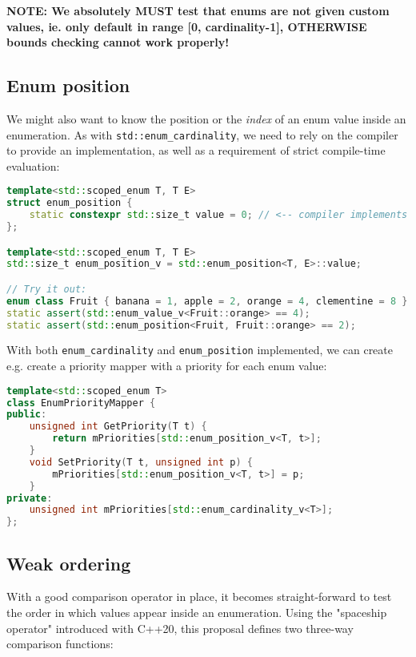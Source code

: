 \documentclass[
  format=manuscript,
  screen=true,
  review=false,
  nonacm=true,
  timestamp=true,
  balance=false]{acmart}
\begin{document}
\noindent
\textbf{NOTE: We absolutely MUST test that enums are not given custom values, ie.
only default in range [0, cardinality-1], OTHERWISE bounds checking cannot work properly!}



\subsection{Enum position}

We might also want to know the position or the \textit{index} of an enum value
inside an enumeration. As with \texttt{std::enum\_cardinality}, we need to rely
on the compiler to provide an implementation, as well as a requirement of strict
compile-time evaluation:\vspace{2mm}

\begin{lstlisting}[language=Cpp]
template<std::scoped_enum T, T E>
struct enum_position {
    static constexpr std::size_t value = 0; // <-- compiler implements this
};

template<std::scoped_enum T, T E>
std::size_t enum_position_v = std::enum_position<T, E>::value;

// Try it out:
enum class Fruit { banana = 1, apple = 2, orange = 4, clementine = 8 };
static assert(std::enum_value_v<Fruit::orange> == 4);
static assert(std::enum_position<Fruit, Fruit::orange> == 2);
\end{lstlisting}

\noindent
With both \texttt{enum\_cardinality} and \texttt{enum\_position} implemented, we
can create e.g. create a priority mapper with a priority for each enum value:\vspace{2mm}

\begin{lstlisting}[language=Cpp]
template<std::scoped_enum T>
class EnumPriorityMapper {
public:
    unsigned int GetPriority(T t) {
        return mPriorities[std::enum_position_v<T, t>];
    }
    void SetPriority(T t, unsigned int p) {
        mPriorities[std::enum_position_v<T, t>] = p;
    }
private:
    unsigned int mPriorities[std::enum_cardinality_v<T>];
};
\end{lstlisting}


\subsection{Weak ordering}

With a good comparison operator in place, it becomes straight-forward to test
the order in which values appear inside an enumeration. Using the "spaceship operator"
introduced with C++20, this proposal defines two three-way comparison functions:\vspace{2mm}
\end{document}
